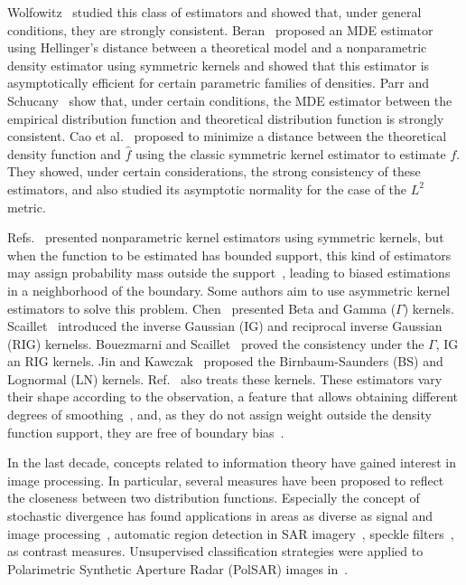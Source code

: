 \documentclass[twocolumn]{svjour3}
\begin{document}
Wolfowitz~\cite{wolfowitz1953, wolfowitz1957} studied this class of estimators and showed that, under general conditions, they are strongly consistent. 
Beran~\cite{beran1977} proposed an MDE estimator using Hellinger's distance between a theoretical model and a nonparametric density estimator using symmetric kernels and showed that this estimator is asymptotically efficient for certain parametric families of densities. 
Parr and Schucany~\cite{parr1982} show that, under certain conditions, the MDE estimator between the empirical distribution function and theoretical distribution function is strongly consistent. 
Cao et al.~\cite{cao1995minimum} proposed to minimize a distance between the theoretical density function and $\widehat{f}$ using the classic symmetric kernel estimator to estimate $f$. 
They showed, under certain considerations, the strong consistency of these estimators, and also studied its asymptotic normality for the case of the $L^2$ metric.

Refs.~\cite{Parzen62,Roseanblatt56} presented nonparametric kernel estimators using symmetric kernels, but when the function to be estimated has bounded support, this kind of estimators may assign probability mass outside the support~\cite{Silverman1986}, leading to biased estimations in a neighborhood of the boundary.
Some authors aim to use asymmetric kernel estimators to solve this problem. 
Chen~\cite{chen1999,chensx2000} presented Beta and Gamma ($\Gamma$) kernels.
Scaillet~\cite{Scaillet2004} introduced the inverse Gaussian (IG) and reciprocal inverse Gaussian (RIG) kernelss.
Bouezmarni and Scaillet~\cite{bouezmarni2005} proved the consistency under the $\Gamma$, IG an RIG kernels. 
Jin and Kawczak~\cite{Jin2003} proposed the Birnbaum-Saunders (BS) and Lognormal (LN) kernels. 
Ref.~\cite{libengue2013} also treats these kernels. 
These estimators vary their shape according to the observation, a feature that allows obtaining different degrees of smoothing~\cite{Scaillet2004}, and, as they do not assign weight outside the density function support, they are free of boundary bias~\cite{chensx2000}.

In the last decade, concepts related to information theory have gained interest in image processing. 
In particular, several measures have been proposed to reflect the closeness between two distribution functions. 
Especially the concept of stochastic divergence has found applications in areas as diverse as signal and image processing~\cite{Aviyente2007}, automatic region detection in SAR imagery~\cite{SilvaCribariFrery:ImprovedLikelihood:Environmetrics,Nascimento2009}, 
speckle filters~\cite{Penna2019}, as contrast measures. 
Unsupervised classification strategies were applied to Polarimetric Synthetic Aperture Radar (PolSAR) images in~\cite{Carvalho2019}.
\end{document}

